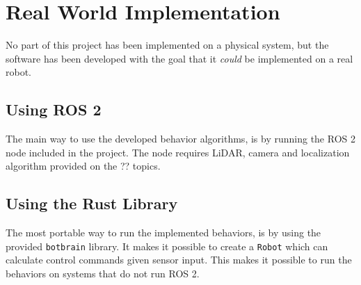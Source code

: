 \section{Real World Implementation}
No part of this project has been implemented on a physical system, but the software has been developed with the goal that it \emph{could} be implemented on a real robot.

\subsection{Using ROS 2}
The main way to use the developed behavior algorithms, is by running the ROS 2 node included in the project. The node requires {\color{red} LiDAR, camera and localization algorithm provided on the ?? topics}.

\subsection{Using the Rust Library}
The most portable way to run the implemented behaviors, is by using the {\color{red} provided} \texttt{botbrain} library. It makes it possible to create a \texttt{Robot} which can calculate control commands given sensor input. This makes it possible to run the behaviors on systems that do not run ROS 2.


